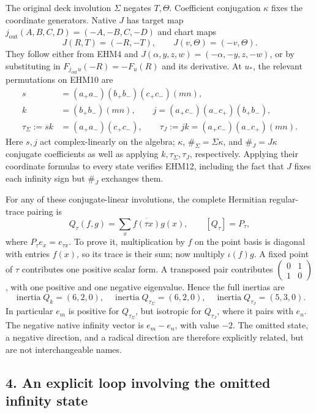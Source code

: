 \documentclass[
  10pt,
  a4paper,
]{article}
\begin{document}
The original deck involution \(\Sigma\) negates \(T,\Theta\).
Coefficient conjugation \(\kappa\) fixes the coordinate generators.
Native \(J\) has target map \(j_{\mathrm{out}}(A,B,C,D)=(-A,-B,C,-D)\)
and chart maps \[
J(R,T)=(-R,-T),\qquad J(v,\Theta)=(-v,\Theta).
\tag{EHM11}
\] They follow either from EHM4 and
\(J(\alpha,y,z,w)=(-\alpha,-y,z,-w)\), or by substituting in
\(F_{j_{\mathrm{out}}u}(-R)=-F_u(R)\) and its derivative. At \(u_*\),
the relevant permutations on EHM10 are \[
\begin{aligned}
s&=(a_+a_-)(b_+b_-)(c_+c_-)(mn),\\
k&=(b_+b_-)(mn),\qquad
j=(a_+c_-)(a_-c_+)(b_+b_-),\\
\tau_\Sigma:=sk&=(a_+a_-)(c_+c_-),\qquad
\tau_J:=jk=(a_+c_-)(a_-c_+)(mn).
\end{aligned}
\tag{EHM12}
\] Here \(s,j\) act complex-linearly on the algebra; \(\kappa\),
\(\#_\Sigma=\Sigma\kappa\), and \(\#_J=J\kappa\) conjugate coefficients
as well as applying \(k,\tau_\Sigma,\tau_J\), respectively. Applying
their coordinate formulas to every state verifies EHM12, including the
fact that \(J\) fixes each infinity sign but \(\#_J\) exchanges them.

For any of these conjugate-linear involutions, the complete Hermitian
regular-trace pairing is \[
Q_\tau(f,g)=\sum_x\overline{f(\tau x)}g(x),\qquad
[Q_\tau]=P_\tau,
\tag{EHM13}
\] where \(P_\tau e_x=e_{\tau x}\). To prove it, multiplication by \(f\)
on the point basis is diagonal with entries \(f(x)\), so its trace is
their sum; now multiply \(\iota(f)g\). A fixed point of \(\tau\)
contributes one positive scalar form. A transposed pair contributes
\(\left(\begin{smallmatrix}0&1\\1&0\end{smallmatrix}\right)\), with one
positive and one negative eigenvalue. Hence the full inertias are \[
\operatorname{inertia}Q_k=(6,2,0),\quad
\operatorname{inertia}Q_{\tau_\Sigma}=(6,2,0),\quad
\operatorname{inertia}Q_{\tau_J}=(5,3,0).
\tag{EHM14}
\] In particular \(e_m\) is positive for \(Q_{\tau_\Sigma}\), but
isotropic for \(Q_{\tau_J}\), where it pairs with \(e_n\). The negative
native infinity vector is \(e_m-e_n\), with value \(-2\). The omitted
state, a negative direction, and a radical direction are therefore
explicitly related, but are not interchangeable names.

\subsection{4. An explicit loop involving the omitted infinity
state}\label{an-explicit-loop-involving-the-omitted-infinity-state}
\end{document}
